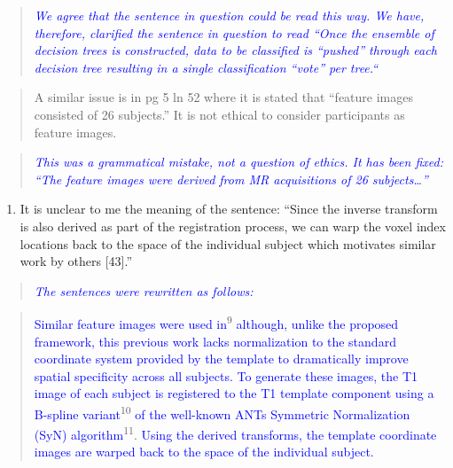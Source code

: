 \documentclass[12pt,]{article}
\providecommand{\tightlist}{%
  \setlength{\itemsep}{0pt}\setlength{\parskip}{0pt}}
\begin{document}
\begin{quote}
\emph{\textcolor{blue}{We agree that the sentence in question could be read this way.
We have, therefore, clarified the sentence in question to read
``Once the ensemble of decision trees is constructed, data to be classified is ``pushed''
through each decision tree resulting in a single classification ``vote'' per tree.``}}
\end{quote}

\begin{quote}
A similar issue is in pg 5 ln 52 where it is stated that ``feature
images consisted of 26 subjects.'' It is not ethical to consider
participants as feature images.
\end{quote}

\begin{quote}
\emph{\textcolor{blue}{This was a grammatical mistake, not a question of
ethics.  It has been fixed: ``The feature images
were derived from MR acquisitions of 26 subjects\ldots''}}
\end{quote}

\begin{enumerate}
\def\labelenumi{\arabic{enumi}.}
\setcounter{enumi}{10}
\tightlist
\item
  It is unclear to me the meaning of the sentence: ``Since the inverse
  transform is also derived as part of the registration process, we can
  warp the voxel index locations back to the space of the individual
  subject which motivates similar work by others {[}43{]}.''
\end{enumerate}

\begin{quote}
\emph{\textcolor{blue}{The sentences were rewritten as follows:}}
\end{quote}

\begin{quote}
\textcolor{blue}{Similar feature images were used in}\textsuperscript{9}
\textcolor{blue}{although, unlike the proposed framework, this previous work lacks
normalization to the standard
coordinate system provided by the template to dramatically improve spatial specificity
across all subjects.  To generate these images, the T1 image of each subject is
registered to the T1 template component using a B-spline variant}\textsuperscript{10}
\textcolor{blue}{of the well-known ANTs Symmetric Normalization (SyN) algorithm}\textsuperscript{11}.
\textcolor{blue}{Using the derived transforms, the template coordinate images are warped back to the space of the individual subject.}
\end{quote}
\end{document}
